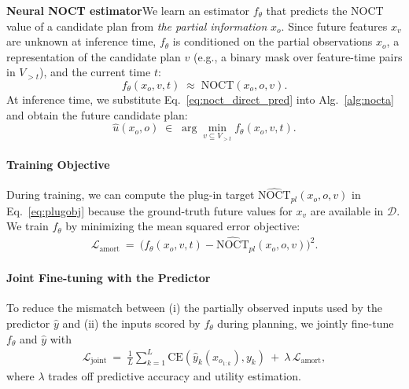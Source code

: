 \textbf{Neural NOCT estimator}\quad We learn an estimator $f_\theta$ that predicts the NOCT value of a candidate plan from \emph{the partial information} $x_o$. Since future features $x_v$ are unknown at inference time, $f_\theta$ is conditioned on
the partial observations $x_o$, a representation of the candidate plan $v$ (e.g., a binary mask over feature-time pairs in $V_{>t}$),
and the current time $t$:
\begin{equation}
f_\theta(x_o, v, t) \;\approx\; \mathrm{NOCT}(x_o,o,v).
\label{eq:noct_direct_pred}
\end{equation}
At inference time, we substitute Eq.~\eqref{eq:noct_direct_pred} into  Alg.~\ref{alg:nocta} and obtain the future candidate plan:
\begin{equation}
\hat u(x_o,o) \;\in\; \arg\min_{v \subseteq V_{>t}} f_\theta(x_o, v, t).
\end{equation}
\paragraph{Training Objective}
During training, we can compute the plug-in target $\widehat{\mathrm{NOCT}}_{pl}(x_o,o,v)$ in Eq.~\eqref{eq:plugobj} because the
ground-truth future values for $x_v$ are available in $\mathcal{D}$. We train $f_\theta$ by minimizing the mean squared error objective:
\begin{align} 
\mathcal{L}_{\mathrm{amort}} ~=~  \big( f_\theta(x_{o}, v, t) - \widehat{\mathrm{NOCT}}_{pl}(x_{o}, o, v) \big)^2. 
\label{eq:value_mse} 
\end{align}
\paragraph{Joint Fine-tuning with the Predictor} To reduce the mismatch between (i) the partially observed inputs used by the predictor $\hat y$ and (ii) the inputs scored by $f_\theta$ during planning, we jointly fine-tune $f_\theta$ and $\hat y$ with
\begin{align}
\mathcal{L}_{\mathrm{joint}}
~=~
\frac{1}{L}\sum_{k=1}^{L} \mathrm{CE}\!\left(\hat y_k(x_{o_{1:k}}), y_k\right)
~+~ \lambda\,\mathcal{L}_{\mathrm{amort}},
\label{eq:direct_joint}
\end{align}
where $\lambda$ trades off predictive accuracy and utility estimation. 





